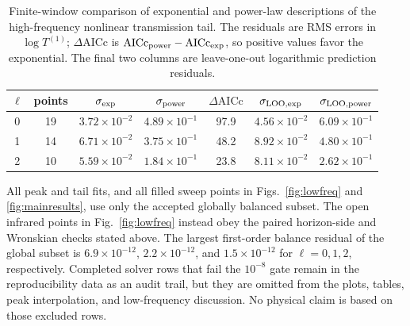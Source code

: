 \documentclass[aps,prd,twocolumn,10pt,nofootinbib,superscriptaddress,floatfix]{revtex4-2}
\begin{document}
\begin{table}[t]
\caption{Finite-window comparison of exponential and power-law descriptions
of the high-frequency nonlinear transmission tail.  The residuals are RMS
errors in $\log T^{(1)}$; $\Delta\mathrm{AICc}$ is
$\mathrm{AICc}_{\rm power}-\mathrm{AICc}_{\rm exp}$, so positive values favor
the exponential.  The final two columns are leave-one-out logarithmic
prediction residuals.}
\label{tab:tail-models}
\begin{ruledtabular}
\begin{tabular}{c c c c c c c}
$\ell$ & points & $\sigma_{\rm exp}$ & $\sigma_{\rm power}$
& $\Delta\mathrm{AICc}$ & $\sigma_{\rm LOO,exp}$ & $\sigma_{\rm LOO,power}$\\
\hline
0 & 19 & $3.72\times10^{-2}$ & $4.89\times10^{-1}$ & 97.9 & $4.56\times10^{-2}$ & $6.09\times10^{-1}$\\
1 & 14 & $6.71\times10^{-2}$ & $3.75\times10^{-1}$ & 48.2 & $8.92\times10^{-2}$ & $4.80\times10^{-1}$\\
2 & 10 & $5.59\times10^{-2}$ & $1.84\times10^{-1}$ & 23.8 & $8.11\times10^{-2}$ & $2.62\times10^{-1}$\\
\end{tabular}
\end{ruledtabular}
\end{table}

All peak and tail fits, and all filled sweep points in
Figs.~\ref{fig:lowfreq} and \ref{fig:mainresults}, use only the accepted
globally balanced subset.  The open infrared points in
Fig.~\ref{fig:lowfreq} instead obey the paired horizon-side and Wronskian
checks stated above.  The largest first-order balance residual of the global
subset
is $6.9\times10^{-12}$, $2.2\times10^{-12}$, and
$1.5\times10^{-12}$ for $\ell=0,1,2$, respectively.  Completed solver rows
that fail the $10^{-8}$ gate remain in the reproducibility data as an audit
trail, but they are omitted from the plots, tables, peak interpolation, and
low-frequency discussion.  No physical claim is based on those excluded rows.
\end{document}
